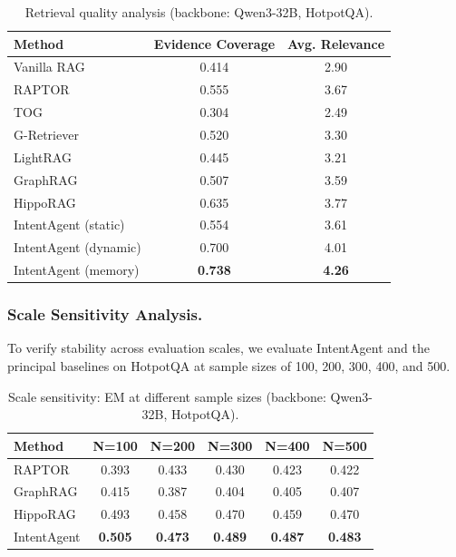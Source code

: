 \documentclass[runningheads]{llncs}
\begin{document}
\begin{table}[htbp]
\centering
\caption{Retrieval quality analysis (backbone: Qwen3-32B, HotpotQA).}
\label{tab:retrieval_quality}
\begin{tabular}{l|cc}
\toprule
\textbf{Method} & \textbf{Evidence Coverage} & \textbf{Avg. Relevance} \\
\midrule
Vanilla RAG & 0.414 & 2.90 \\
RAPTOR & 0.555 & 3.67 \\
TOG & 0.304 & 2.49 \\
G-Retriever & 0.520 & 3.30 \\
LightRAG & 0.445 & 3.21 \\
GraphRAG & 0.507 & 3.59 \\
HippoRAG & 0.635 & 3.77 \\
\midrule
IntentAgent (static) & 0.554 & 3.61 \\
IntentAgent (dynamic) & 0.700 & 4.01 \\
IntentAgent (memory) & \textbf{0.738} & \textbf{4.26} \\
\bottomrule
\end{tabular}
\end{table}

\subsubsection{Scale Sensitivity Analysis.}

To verify stability across evaluation scales, we evaluate IntentAgent and the principal baselines on HotpotQA at sample sizes of 100, 200, 300, 400, and 500.

\begin{table}[htbp]
\centering
\caption{Scale sensitivity: EM at different sample sizes (backbone: Qwen3-32B, HotpotQA).}
\label{tab:scale_sensitivity}
\begin{tabular}{l|ccccc}
\toprule
\textbf{Method} & \textbf{N=100} & \textbf{N=200} & \textbf{N=300} & \textbf{N=400} & \textbf{N=500} \\
\midrule
RAPTOR & 0.393 & 0.433 & 0.430 & 0.423 & 0.422 \\
GraphRAG & 0.415 & 0.387 & 0.404 & 0.405 & 0.407 \\
HippoRAG & 0.493 & 0.458 & 0.470 & 0.459 & 0.470 \\
IntentAgent & \textbf{0.505} & \textbf{0.473} & \textbf{0.489} & \textbf{0.487} & \textbf{0.483} \\
\bottomrule
\end{tabular}
\end{table}
\end{document}
